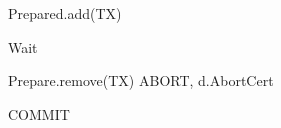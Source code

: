 \begin{algorithm}
\begin{algorithmic}[1]
\EndFor
\State Prepared.add(TX) 


\State Wait
\EndWhile

			Prepare.remove(TX)
			\State \Return ABORT, d.AbortCert
		\EndIf
		
       
\EndFor


\State \Return COMMIT


\end{algorithmic}

\end{algorithm}





